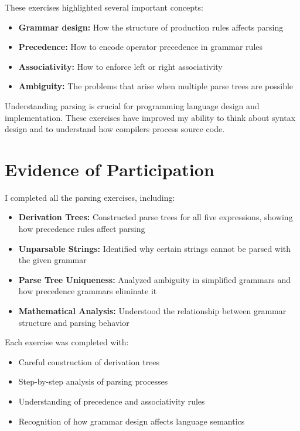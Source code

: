 \documentclass{article}
\theoremstyle{plain}
\theoremstyle{definition}
\theoremstyle{remark}
\begin{document}
These exercises highlighted several important concepts:

\begin{itemize}
\item \textbf{Grammar design:} How the structure of production rules affects parsing
\item \textbf{Precedence:} How to encode operator precedence in grammar rules
\item \textbf{Associativity:} How to enforce left or right associativity
\item \textbf{Ambiguity:} The problems that arise when multiple parse trees are possible
\end{itemize}

Understanding parsing is crucial for programming language design and implementation. These exercises have improved my ability to think about syntax design and to understand how compilers process source code.

\section{Evidence of Participation}

I completed all the parsing exercises, including:

\begin{itemize}
\item \textbf{Derivation Trees:} Constructed parse trees for all five expressions, showing how precedence rules affect parsing
\item \textbf{Unparsable Strings:} Identified why certain strings cannot be parsed with the given grammar
\item \textbf{Parse Tree Uniqueness:} Analyzed ambiguity in simplified grammars and how precedence grammars eliminate it
\item \textbf{Mathematical Analysis:} Understood the relationship between grammar structure and parsing behavior
\end{itemize}

Each exercise was completed with:
\begin{itemize}
\item Careful construction of derivation trees
\item Step-by-step analysis of parsing processes
\item Understanding of precedence and associativity rules
\item Recognition of how grammar design affects language semantics
\end{itemize}
\end{document}
